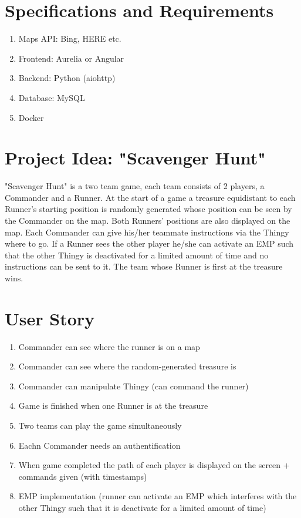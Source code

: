 \documentclass{article}
\begin{document}
	\pagestyle{fancy}
	
	\section{Specifications and Requirements}
	\begin{adjustwidth}{2em}{2em}
		\begin{enumerate}[\tiny \textbullet]
			\item Maps API: Bing, HERE etc.
			\item Frontend: Aurelia or Angular
			\item Backend: Python (aiohttp)
			\item Database: MySQL
			\item Docker
		\end{enumerate}
	\end{adjustwidth}
	
	\section{Project Idea: "Scavenger Hunt"}
	\begin{adjustwidth}{2em}{2em}
		"Scavenger Hunt" is a two team game, each team consists of 2 players, a Commander and a Runner. At the start of a game a treasure equidistant to each Runner's starting position is randomly generated whose position can be seen by the Commander on the map. Both Runners' positions are also displayed on the map. Each Commander can give his/her teammate instructions via the Thingy where to go. If a Runner sees the other player he/she can activate an EMP such that the other Thingy is deactivated for a limited amount of time and no instructions can be sent to it. The team whose Runner is first at the treasure wins. 
	\end{adjustwidth}
	
	\section{User Story}
	\begin{adjustwidth}{2em}{2em}
		\begin{enumerate}
			\item Commander can see where the runner is on a map
			\item Commander can see where the random-generated treasure is
			\item Commander can manipulate Thingy (can command the runner)
			\item Game is finished when one Runner is at the treasure
			\item Two teams can play the game simultaneously
			\item Eachn Commander needs an authentification
			\item When game completed the path of each player is displayed on the screen + commands given (with timestamps)
			\item EMP implementation (runner can activate an EMP which interferes with the other Thingy such that it is deactivate for a limited amount of time)
		\end{enumerate}
	\end{adjustwidth}
\end{document}
